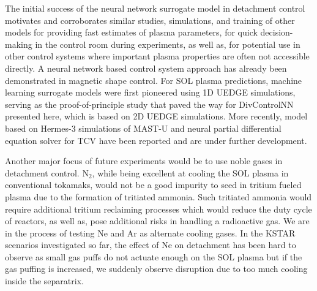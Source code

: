 The initial success of the neural network surrogate model in detachment control motivates and corroborates similar studies, simulations, and training of other models for providing fast estimates of plasma parameters, for quick decision-making in the control room during experiments, as well as, for potential use in other control systems where important plasma properties are often not accessible directly.
A neural network based control system approach has already been demonstrated in magnetic shape control\cite{Degrave_2022_Nature}.
For \ac{SOL} plasma predictions, machine learning surrogate models were first pioneered using 1D UEDGE simulations\cite{Zhu_2022_JPP}, serving as the proof-of-principle study that paved the way for DivControlNN presented here, which is based on 2D UEDGE simulations.
More recently, model based on Hermes-3\cite{Dudson_2024_CPC} simulations of MAST-U\cite{Holt_2024_NF} and neural partial differential equation solver for TCV\cite{Poels_2023_NF} have been reported and are under further development.

Another major focus of future experiments would be to use noble gases in detachment control.
N$_2$, while being excellent at cooling the SOL plasma in conventional tokamaks, would not be a good impurity to seed in tritium fueled plasma due to the formation of tritiated ammonia\cite{Pitts_2019_NME}.
Such tritiated ammonia would require additional tritium reclaiming processes which would reduce the duty cycle of reactors, as well as, pose additional risks in handling a radioactive gas.
We are in the process of testing Ne and Ar as alternate cooling gases.
In the KSTAR scenarios investigated so far, the effect of Ne on detachment has been hard to observe as small gas puffs do not actuate enough on the \ac{SOL} plasma but if the gas puffing is increased, we suddenly observe disruption due to too much cooling inside the separatrix.
